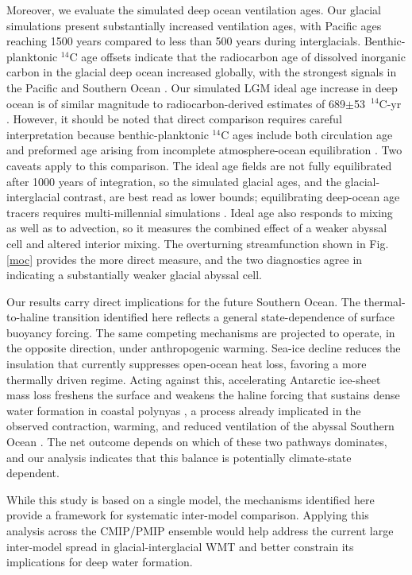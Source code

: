\documentclass[pdflatex,sn-nature]{sn-jnl}
\begin{document}
Moreover, we evaluate the simulated deep ocean ventilation ages. Our glacial simulations present substantially increased ventilation ages, with Pacific ages reaching 1500 years compared to less than 500 years during interglacials. Benthic-planktonic $^{14}$C age offsets indicate that the radiocarbon age of dissolved inorganic carbon in the glacial deep ocean increased globally, with the strongest signals in the Pacific and Southern Ocean \cite{Skinner2010,Skinner2017}. Our  simulated LGM ideal age increase in deep ocean is of similar magnitude to radiocarbon-derived estimates of  689$\pm$53~$^{14}$C-yr \cite{Skinner2017}. However, it should be noted that direct comparison requires careful interpretation because benthic-planktonic $^{14}$C ages include both circulation age and preformed age arising from incomplete atmosphere-ocean equilibration \cite{Koeve2015}. Two caveats apply to this comparison. The ideal age fields are not fully equilibrated after 1000 years of integration, so the simulated glacial ages, and the glacial-interglacial contrast, are best read as lower bounds; equilibrating deep-ocean age tracers requires multi-millennial simulations \cite{Millet2025}. Ideal age also responds to mixing as well as to advection, so it measures the combined effect of a weaker abyssal cell and altered interior mixing. The overturning streamfunction shown in Fig. \ref{moc} provides the more direct measure, and the two diagnostics agree in indicating a substantially weaker glacial abyssal cell.

Our results carry direct implications for the future Southern Ocean. The thermal-to-haline transition identified here reflects a general state-dependence of surface buoyancy forcing. The same competing mechanisms are projected to operate, in the opposite direction, under anthropogenic warming. Sea-ice decline reduces the insulation that currently suppresses open-ocean heat loss, favoring a more thermally driven regime. Acting against this, accelerating Antarctic ice-sheet mass loss freshens the surface and weakens the haline forcing that sustains dense water formation in coastal polynyas \cite{Silvano2018,Jeong2023}, a process already implicated in the observed contraction, warming, and reduced ventilation of the abyssal Southern Ocean \cite{Li2023Nature,Gunn2023}. The net outcome depends on which of these two pathways dominates, and our analysis indicates that this balance is potentially climate-state dependent.

While this study is based on a single model, the mechanisms identified here provide a framework for systematic inter-model comparison. Applying this analysis across the CMIP/PMIP ensemble would help address the current large inter-model spread in glacial-interglacial WMT and better constrain its implications for deep water formation.
\end{document}
